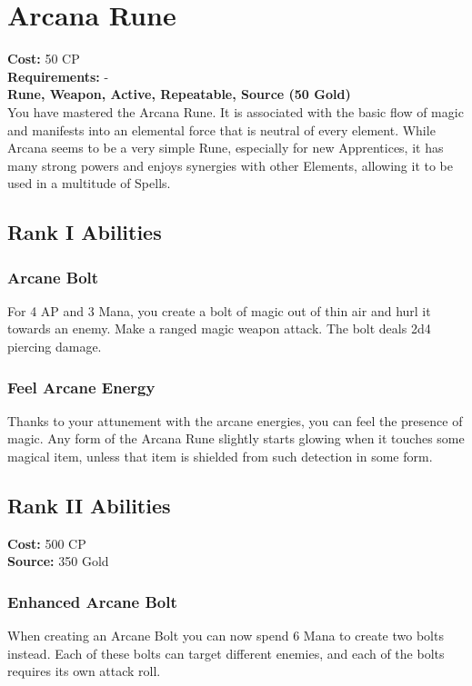 \section{Arcana Rune}\label{rune:arcana}
\textbf{Cost:} 50 CP\\
\textbf{Requirements:} -\\
\textbf{Rune, Weapon, Active, Repeatable, Source (50 Gold)}\\
You have mastered the Arcana Rune.
It is associated with the basic flow of magic and manifests into an elemental force that is neutral of every element.
While Arcana seems to be a very simple Rune, especially for new Apprentices, it has many strong powers and enjoys synergies with other Elements, allowing it to be used in a multitude of Spells.\\

\subsection{Rank I Abilities}

\subsubsection{Arcane Bolt}
For 4 AP and 3 Mana, you create a bolt of magic out of thin air and hurl it towards an enemy.
Make a ranged magic weapon attack.
The bolt deals 2d4 piercing damage.

\subsubsection{Feel Arcane Energy}
Thanks to your attunement with the arcane energies, you can feel the presence of magic.
Any form of the Arcana Rune slightly starts glowing when it touches some magical item, unless that item is shielded from such detection in some form.

\subsection{Rank II Abilities}
\textbf{Cost:} 500 CP\\
\textbf{Source:} 350 Gold
\subsubsection{Enhanced Arcane Bolt}
When creating an Arcane Bolt you can now spend 6 Mana to create two bolts instead.
Each of these bolts can target different enemies, and each of the bolts requires its own attack roll.

